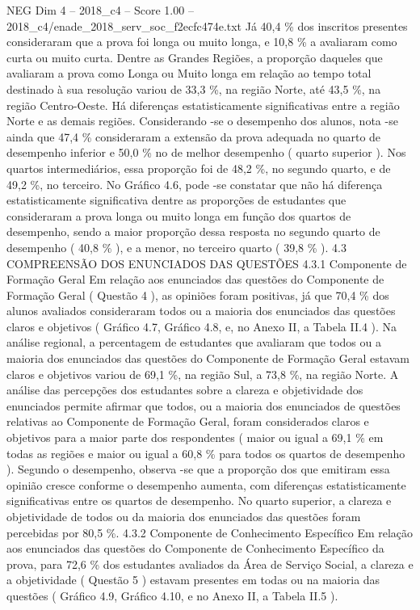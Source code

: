\begin{textsample}{NEG Dim 4 – 2018\_c4 – Score 1.00 – 2018\_c4/enade\_2018\_serv\_soc\_f2ecfc474e.txt}
Já 40,4 \% dos inscritos presentes consideraram que a prova foi longa ou muito longa, e 10,8 \% a avaliaram como curta ou muito curta.
Dentre as Grandes Regiões, a proporção daqueles que avaliaram a prova como Longa ou Muito longa em relação ao tempo total destinado à sua resolução variou de 33,3 \%, na região Norte, até 43,5 \%, na região Centro-Oeste.
Há diferenças estatisticamente significativas entre a região Norte e as demais regiões.
Considerando -se o desempenho dos alunos, nota -se ainda que 47,4 \% consideraram a extensão da prova adequada no quarto de desempenho inferior e 50,0 \% no de melhor desempenho ( quarto superior ).
Nos quartos intermediários, essa proporção foi de 48,2 \%, no segundo quarto, e de 49,2 \%, no terceiro.
No Gráfico 4.6, pode -se constatar que não há diferença estatisticamente significativa dentre as proporções de estudantes que consideraram a prova longa ou muito longa em função dos quartos de desempenho, sendo a maior proporção dessa resposta no segundo quarto de desempenho ( 40,8 \% ), e a menor, no terceiro quarto ( 39,8 \% ). 4.3 COMPREENSÃO DOS ENUNCIADOS DAS QUESTÕES 4.3.1 Componente de Formação Geral Em relação aos enunciados das questões do Componente de Formação Geral ( Questão 4 ), as opiniões foram positivas, já que 70,4 \% dos alunos avaliados consideraram todos ou a maioria dos enunciados das questões claros e objetivos ( Gráfico 4.7, Gráfico 4.8, e, no Anexo II, a Tabela II.4 ).
Na análise regional, a percentagem de estudantes que avaliaram que todos ou a maioria dos enunciados das questões do Componente de Formação Geral estavam claros e objetivos variou de 69,1 \%, na região Sul, a 73,8 \%, na região Norte.
A análise das percepções dos estudantes sobre a clareza e objetividade dos enunciados permite afirmar que todos, ou a maioria dos enunciados de questões relativas ao Componente de Formação Geral, foram considerados claros e objetivos para a maior parte dos respondentes ( maior ou igual a 69,1 \% em todas as regiões e maior ou igual a 60,8 \% para todos os quartos de desempenho ).
Segundo o desempenho, observa -se que a proporção dos que emitiram essa opinião cresce conforme o desempenho aumenta, com diferenças estatisticamente significativas entre os quartos de desempenho.
No quarto superior, a clareza e objetividade de todos ou da maioria dos enunciados das questões foram percebidas por 80,5 \%. 4.3.2 Componente de Conhecimento Específico Em relação aos enunciados das questões do Componente de Conhecimento Específico da prova, para 72,6 \% dos estudantes avaliados da Área de Serviço Social, a clareza e a objetividade ( Questão 5 ) estavam presentes em todas ou na maioria das questões ( Gráfico 4.9, Gráfico 4.10, e no Anexo II, a Tabela II.5 ).

\end{textsample}
